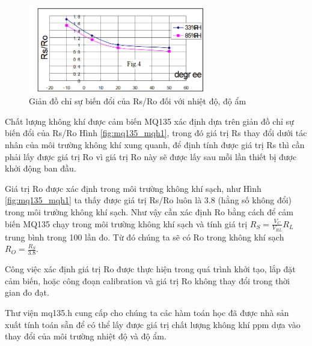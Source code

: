 \begin{figure}[H]
	\centering    
	\includegraphics[width=0.7\textwidth]{mq135_mqh2}
	\caption[Giản đồ chỉ sự biến đổi của Rs/Ro đối với nhiệt độ, độ ẩm]{Giản đồ chỉ sự biến đổi của Rs/Ro đối với nhiệt độ, độ ẩm}
	\label{fig:mq135_mqh2}
\end{figure}


Chất lượng không khí được cảm biến MQ135 xác định dựa trên giản đồ chỉ sự biến đổi của Rs/Ro Hình \ref{fig:mq135_mqh1}, trong đó giá trị Rs thay đổi dưới tác nhân của môi trường không khí xung quanh, để định tính được giá trị Rs thì cần phải lấy được giá trị Ro vì giá trị Ro này sẽ được lấy sau mỗi lần thiết bị được khởi động ban đầu. 

Giá trị Ro được xác định trong môi trường không khí sạch, như Hình \ref{fig:mq135_mqh1} ta thấy được giá trị Rs/Ro luôn là 3.8 (hằng số không đổi) trong môi trường không khí sạch. Như vậy cần xác định Ro bằng cách để cảm biến MQ135 chạy trong môi trường không khí sạch và tính giá trị $R_{S}=\frac{V_{C}}{V_{RL}}R_{L}$ trung bình trong 100 lần đo. Từ đó chúng ta sẽ có Ro trong không khí sạch $R_{O} = \frac{R_{S}}{3.8}$.

Công việc xác định giá trị Ro được thực hiện trong quá trình khởi tạo, lắp đặt cảm biến, hoặc công đoạn calibration và giá trị Ro không thay đổi trong thời gian đo đạt.

Thư viện mq135.h cung cấp cho chúng ta các hàm toán học đã được nhà sản xuất tính toán sẵn để có thể lấy được giá trị chất lượng không khí ppm dựa vào thay đổi của môi trường nhiệt độ và độ ẩm.



